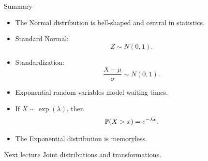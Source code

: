 \begin{frame}{Summary}
\begin{itemize}
    \item The Normal distribution is bell-shaped and central in statistics.

    \item Standard Normal:
    \[
    Z\sim N(0,1).
    \]

    \item Standardization:
    \[
    \frac{X-\mu}{\sigma}\sim N(0,1).
    \]

    \item Exponential random variables model waiting times.

    \item If $X\sim \operatorname{exp}(\lambda)$, then
    \[
    \mathbb{P}(X>x)=e^{-\lambda x}.
    \]

    \item The Exponential distribution is memoryless.
\end{itemize}

\vspace{0.25cm}

\begin{keybox}{Next lecture}
Joint distributions and transformations.
\end{keybox}
\end{frame}